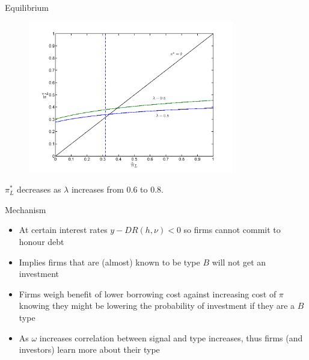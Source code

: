 \documentclass{beamer}
\newtheorem{prop}[theorem]{Proposition}
\begin{document}
\begin{frame}{Equilibrium}
\begin{figure}
\centering
\includegraphics[width=0.8\textwidth]{EQ_comp_L_l.png}
\end{figure}
$\pi^{*}_{L}$ decreases as $\lambda$ increases from 0.6 to 0.8.
\end{frame}


\begin{frame}{Mechanism}
\begin{itemize}
	\item At certain interest rates $y-DR(h,\nu)<0$ so firms cannot commit to honour debt
	\item Implies firms that are (almost) known to be type $B$ will not get an investment
	\item Firms weigh benefit of lower borrowing cost against increasing cost of $\pi$ knowing they might be lowering the probability of investment if they are a $B$ type
	\item As $\omega$ increases correlation between signal and type increases, thus firms (and investors) learn more about their type
\end{itemize}
\end{frame}
\end{document}
